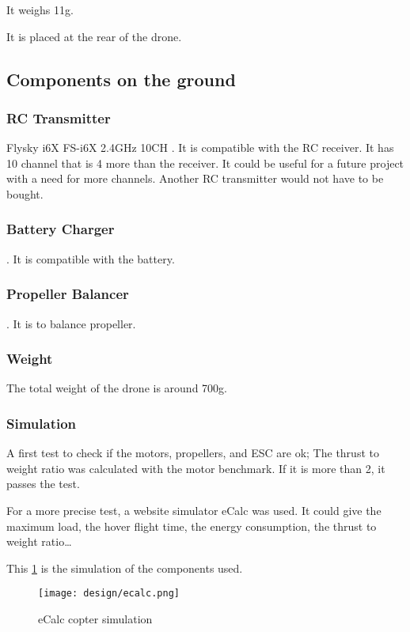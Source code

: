 It weighs 11g.

It is placed at the rear of the drone.

\subsection{Components on the ground}

\subsubsection{RC Transmitter}
Flysky i6X FS-i6X 2.4GHz 10CH \cite{bangood_transmitter}. It is compatible with the RC receiver. It has 10 channel that is 4 more than the receiver. It could be useful for a future project with a need for more channels. Another RC transmitter would not have to be bought.

\subsubsection{Battery Charger}
\cite{bangood_battery_charger}. It is compatible with the battery.

\subsubsection{Propeller Balancer}
\cite{bangood_prop_balancer}. It is to balance propeller.

\subsubsection{Weight}
The total weight of the drone is around 700g.

\subsubsection{Simulation}

A first test to check if the motors, propellers, and ESC are ok; The thrust to weight ratio was calculated with the motor benchmark. If it is more than 2, it passes the test.

For a more precise test, a website simulator eCalc was used. It could give the maximum load, the hover flight time, the energy consumption, the thrust to weight ratio…

This \ref{fig:ecalc} is the simulation of the components used.

\begin{figure}[!ht]
    \centering
    \texttt{[image: design/ecalc.png]}
    \caption{eCalc copter simulation}
    \label{fig:ecalc}
\end{figure}
